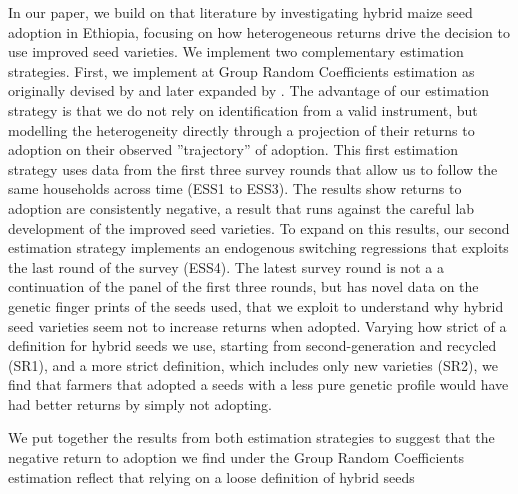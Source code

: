 \documentclass{article}
\begin{document}
In our paper, we build on that literature by investigating hybrid maize seed adoption in Ethiopia, focusing on how heterogeneous returns drive the decision to use improved seed varieties. We implement two complementary estimation strategies. First, we implement at Group Random Coefficients estimation as originally devised by \cite{Suri2011-oi} and later expanded by \citep{Tjernstrom_Emilia_Dalia_Ghanem_Oscar_Barriga_Cabanillas_Travis_J_Lybbert_Jeffrey_D_Michler_and_Aleksandr_Michuda2020-bc}. The advantage of our estimation strategy is that we do not rely on identification from a valid instrument,
but modelling the heterogeneity directly through a projection of their returns to adoption on their observed
”trajectory” of adoption. This first estimation strategy uses data from the first three survey rounds that allow us to follow the same households across time (ESS1 to ESS3). The results show returns to adoption are consistently negative, a result that runs against the careful lab development of the improved seed varieties. To expand on this results, our second estimation strategy implements an endogenous switching regressions that exploits the last round of the survey (ESS4). The latest survey round is not a a continuation of the panel of the first three rounds, but has novel data on the genetic finger prints of the seeds used, that we exploit to understand why hybrid seed varieties seem not to increase returns when adopted. Varying how strict of a definition for hybrid seeds we use, starting from second-generation and recycled (SR1), and a more strict definition, which includes only new varieties (SR2), we find that  farmers that adopted a seeds with a less pure genetic profile would have had better returns by simply not adopting. 

We put together the results from both estimation strategies to suggest that the negative return to adoption we find under the Group Random Coefficients estimation reflect that relying on a loose definition of hybrid seeds
\end{document}
